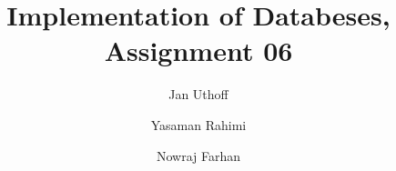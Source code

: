 \documentclass{exercisesheet}
\title{Implementation of Databeses, Assignment 06}
\author{
    Jan Uthoff
    \and
    Yasaman Rahimi
    \and
    Nowraj Farhan
}
\begin{document}
\maketitle

\pointtable


\end{document}
